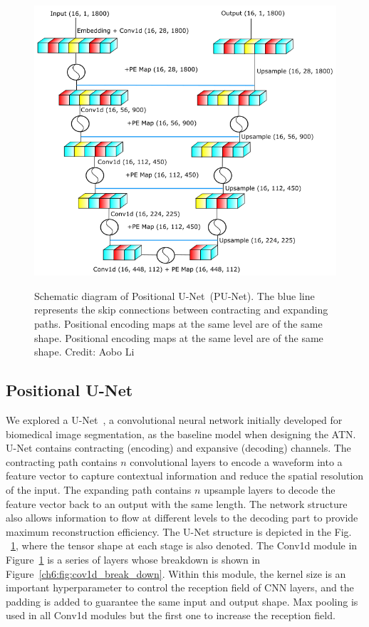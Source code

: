 
\begin{figure}[htb!]
\centering
    \includegraphics[width=0.7\linewidth]{ch6/figs/unet.png}
    \label{fig:cpunet}
    \caption{Schematic diagram of Positional U-Net~(PU-Net). The blue line represents the  skip connections between contracting and expanding paths. Positional encoding maps at the same level are of the same shape. Positional encoding maps at the same level are of the same shape. Credit: Aobo Li}
   \label{fig:network_schematic}
\end{figure}



\subsection{Positional U-Net}

We explored a U-Net~\cite{UNet}, a convolutional neural network initially developed for biomedical image segmentation, as the baseline model when designing the ATN. U-Net contains contracting (encoding) and expansive (decoding) channels. The contracting path contains $n$ convolutional layers to encode a waveform into a feature vector to capture contextual information and reduce the spatial resolution of the input. The expanding path contains $n$ upsample layers to decode the feature vector back to an output with the same length. The network structure also allows information to flow at different levels to the decoding part to provide maximum reconstruction efficiency. The U-Net structure is depicted in the Fig. ~\ref{fig:network_schematic}, where the tensor shape at each stage is also denoted. The Conv1d module in Figure~\ref{fig:network_schematic} is a series of layers whose breakdown is shown in Figure~\ref{ch6:fig:cov1d_break_down}. Within this module, the kernel size is an important hyperparameter to control the reception field of CNN layers, and the padding is added to guarantee the same input and output shape. Max pooling is used in all Conv1d modules but the first one to increase the reception field. 

